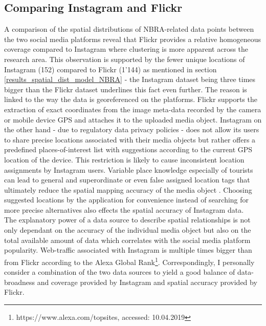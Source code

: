 \subsection{Comparing Instagram and Flickr}
A comparison of the spatial distributions of NBRA-related data points between the two social media platforms reveal that Flickr provides a relative homogeneous coverage compared to Instagram where clustering is more apparent across the research area. This observation is supported by the fewer unique locations of Instagram (152) compared to Flickr (1'144) as mentioned in section \ref{results_spatial_dist_model_NBRA} - the Instagram dataset being three times bigger than the Flickr dataset underlines this fact even further. The reason is linked to the way the data is georeferenced on the platforms. Flickr supports the extraction of exact coordinates from the image meta-data recorded by the camera or mobile device GPS and attaches it to the uploaded media object. Instagram on the other hand - due to regulatory data privacy policies - does not allow its users to share precise locations associated with their media objects but rather offers a predefined places-of-interest list with suggestions according to the current GPS location of the device. This restriction is likely to cause inconsistent location assignments by Instagram users. Variable place knowledge especially of tourists can lead to general and superordinate or even false assigned location tags that ultimately reduce the spatial mapping accuracy of the media object \parencite{Flatow2015}. Choosing suggested locations by the application for convenience instead of searching for more precise alternatives also effects the spatial accuracy of Instagram data. \\
The explanatory power of a data source to describe spatial relationships is not only dependant on the accuracy of the individual media object but also on the total available amount of data which correlates with the social media platform popularity. Web-traffic associated with Instagram is multiple times bigger than from Flickr according to the Alexa Global Rank\footnote{https://www.alexa.com/topsites, accessed: 10.04.2019}. Correspondingly, I personally consider a combination of the two data sources to yield a good balance of data-broadness and coverage provided by Instagram and spatial accuracy provided by Flickr.

